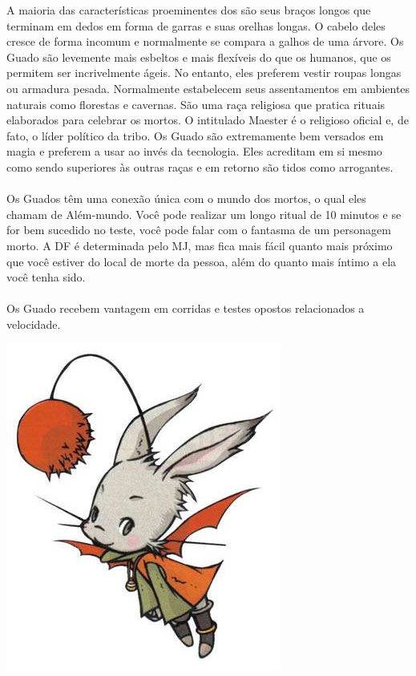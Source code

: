 %
A maioria das características proeminentes dos  são seus braços longos que terminam em dedos em forma de garras e suas orelhas longas.
O cabelo deles cresce de forma incomum e normalmente se compara a galhos de uma árvore.
Os Guado são levemente mais esbeltos e mais flexíveis do que os humanos, que os permitem ser incrivelmente ágeis.
No entanto, eles preferem vestir roupas longas ou armadura pesada. Normalmente estabelecem seus assentamentos em ambientes naturais como florestas e cavernas.
São uma raça religiosa que pratica rituais elaborados para celebrar os mortos.
O intitulado Maester é o religioso oficial e, de fato, o líder político da tribo.
Os Guado são extremamente bem versados em magia e preferem a usar ao invés da tecnologia.
Eles acreditam em si mesmo como sendo superiores às outras raças e em retorno são tidos como arrogantes.
%
\\\\
%
 Os Guados têm uma conexão única com o mundo dos mortos, o qual eles chamam de Além-mundo. Você pode realizar um longo ritual de 10 minutos e se for bem sucedido no teste, você pode falar com o fantasma de um personagem morto.
A DF é determinada pelo MJ, mas fica mais fácil quanto mais próximo que você estiver do local de morte da pessoa, além do quanto mais íntimo a ela você tenha sido.
%
\\\\
%
 Os Guado recebem vantagem em corridas e testes opostos relacionados a velocidade.
%
\clearpage
%
%
\begin{center} \includegraphics[width=0.8\columnwidth]{./art/races/moogle.jpg}  \end{center}
